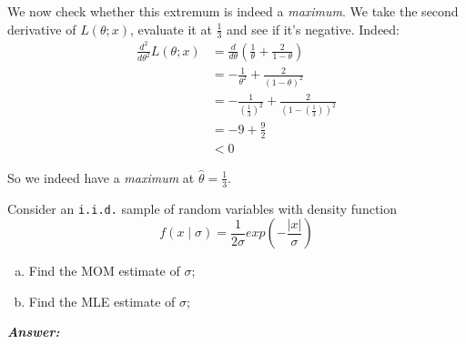 \documentclass[12pt]{article}
\newenvironment{question}[2][Question]{\begin{trivlist}
\item[\hskip \labelsep {\bfseries #1}\hskip \labelsep {\bfseries #2.}]}{\end{trivlist}}
\begin{document}
We now check whether this extremum is indeed a \emph{maximum}. We take the second derivative of $L(\theta; x)$, evaluate it at $\frac{1}{3}$ and see if it's negative. Indeed:
\begin{align*}
\frac{d^2} {d \theta^2} L(\theta; x) &= \frac{d} {d \theta} \left(\frac{1}{\theta} + \frac{2}{1 - \theta} \right) \\
&= -\frac{1}{\theta^2} + \frac{2}{(1 - \theta)^2} \\
&= -\frac{1}{(\frac{1}{3})^2} + \frac{2}{(1 - (\frac{1}{3}))^2} \\
&= -9 + \frac{9}{2}\\
&< 0 
\end{align*}
\begin{center}
So we indeed have a \emph{maximum} at  $\hat \theta = \frac{1}{3}$.
\end{center}

\bigskip
\bigskip
 \begin{question}{4.2} Consider an \texttt{i.i.d.} sample of random variables with density function
 $$
f(x \mid \sigma) = \frac{1}{2\sigma}exp(- \frac{|x|}{\sigma})
 $$
 \begin{enumerate}[(a)]
\item Find the MOM estimate of $\sigma$;
\item Find the MLE estimate of $\sigma$;
\end{enumerate}
\end{question} 


  \textbf{\color{TealBlue}\emph{Answer:} } 
 
\end{document}
